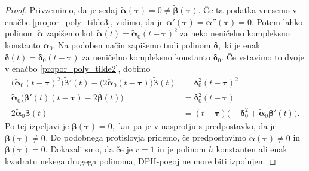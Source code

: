 \documentclass[12pt,a4paper,twoside]{article}
\theoremstyle{definition} %
\theoremstyle{plain} %
\theoremstyle{primerstyle}
\numberwithin{equation}{section}  %
\newcommand{\bdelta}{\boldsymbol \delta}
\newcommand{\btau}{\boldsymbol \tau}
\newcommand{\btalpha}{\tilde{\boldsymbol \alpha}}
\newcommand{\btbeta}{\tilde{\boldsymbol \beta}}
\begin{document}
\begin{proof}
	Privzemimo, da je sedaj $\btalpha(\btau)=0\neq\btbeta(\btau).$ Če ta podatka vnesemo v enačbe \eqref{propor_poly_tilde3}, vidimo, da je $\btalpha'(\btau)=\btalpha''(\btau)=0.$ Potem lahko polinom $\btalpha$ zapišemo kot $\btalpha(t)=\btalpha_0(t-\btau)^2$ za neko neničelno kompleksno konstanto $\btalpha_0.$ Na podoben način zapišemo tudi polinom $\bdelta,$ ki je enak $\bdelta(t)=\bdelta_0(t-\btau)$ za neničelno kompleksno konstanto $\bdelta_0.$ Če vstavimo to dvoje v enačbo \eqref{propor_poly_tilde2}, dobimo
	\begin{align*}
		\big(\btalpha_0(t-\btau)^2\big)\btbeta'(t)-\big(2\btalpha_0(t-\btau)\big)\btbeta(t)&=\bdelta_0^2(t-\btau)^2\\
		\btalpha_0\big(\btbeta'(t)(t-\btau)-2\btbeta(t)\big)&=\bdelta_0^2(t-\btau)\\
		2\btalpha_0\btbeta(t)&=(t-\btau)\big(-\bdelta_0^2+\btalpha_0\btbeta'(t)\big).
	\end{align*}
	Po tej izpeljavi je $\btbeta(\btau)=0,$ kar pa je v nasprotju s predpostavko, da je $\btbeta(\btau)\neq0.$ Do podobnega protislovja pridemo, če predpostavimo $\btalpha(\btau)\neq0$ in $\btbeta(\btau)=0.$ Dokazali smo, da če je $r=1$ in je polinom $h$ konstanten ali enak kvadratu nekega drugega polinoma, DPH-pogoj ne more biti izpolnjen.
\end{proof}
\end{document}
